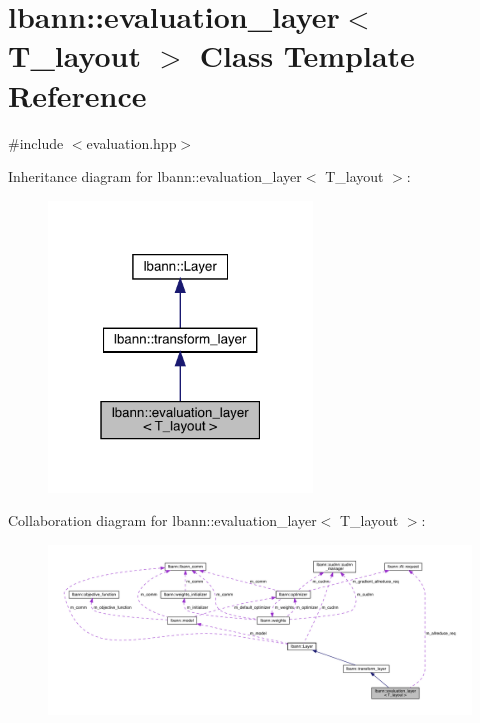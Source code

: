 \hypertarget{classlbann_1_1evaluation__layer}{}\section{lbann\+:\+:evaluation\+\_\+layer$<$ T\+\_\+layout $>$ Class Template Reference}
\label{classlbann_1_1evaluation__layer}


{\ttfamily \#include $<$evaluation.\+hpp$>$}



Inheritance diagram for lbann\+:\+:evaluation\+\_\+layer$<$ T\+\_\+layout $>$\+:\nopagebreak
\begin{figure}[H]
\begin{center}
\leavevmode
\includegraphics[width=199pt]{classlbann_1_1evaluation__layer__inherit__graph}
\end{center}
\end{figure}


Collaboration diagram for lbann\+:\+:evaluation\+\_\+layer$<$ T\+\_\+layout $>$\+:\nopagebreak
\begin{figure}[H]
\begin{center}
\leavevmode
\includegraphics[width=350pt]{classlbann_1_1evaluation__layer__coll__graph}
\end{center}
\end{figure}

